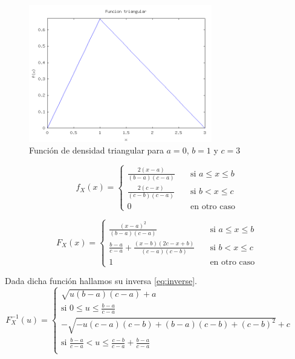 \documentclass{sig-alternate}
\begin{document}
\begin{figure}[ht]
\label{fig:triangle_fun}
\includegraphics[width=8cm]{triangular}
\caption{Funci\'on de densidad triangular para $a=0$, $b=1$ y $c=3$}
\end{figure}


\begin{equation}
\label{eq:triangle}
f_{X}(x) =
\begin{cases}
\frac{2(x-a)}{(b-a)(c-a)} \quad & \text{si } a \leq x \leq b \\
\frac{2(c-x)}{(c-b)(c-a)} \quad & \text{si } b < x \leq c \\
0 \quad & \text{en otro caso}
\end{cases}
\end{equation}

\begin{equation}
\label{eq:triangleDistribution}
F_{X}(x) =
\begin{cases}
\frac{(x-a)^{2}}{(b-a)(c-a)} \quad & \text{si } a \leq x \leq b \\
\frac{b-a}{c-a} + \frac{(x-b)(2c-x+b)}{(c-a)(c-b)} \quad & \text{si } b < x \leq c \\
1 \quad & \text{en otro caso}
\end{cases}
\end{equation}

Dada dicha funci\'on hallamos su inversa \eqref{eq:inverse}.\\

\begin{equation}
\label{eq:inverse}
F^{-1}_{X}(u) =
\begin{cases}
\sqrt{u(b-a)(c-a)}+a \quad & \\
\text{si } 0 \leq u \leq \frac{b-a}{c-a} & \\
-\sqrt{-u(c-a)(c-b)+(b-a)(c-b)+(c-b)^{2}} + c \quad & \\
\text{si } \frac{b-a}{c-a} < u \leq \frac{c-b}{c-a}+\frac{b-a}{c-a} \\
\end{cases}
\end{equation}
\end{document}
